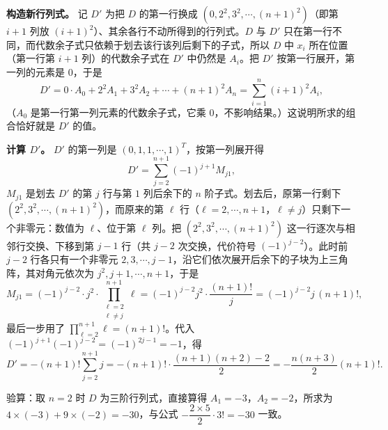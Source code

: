 \begin{solution}
\textbf{构造新行列式。} 记 $D'$ 为把 $D$ 的第一行换成 $(0,2^{2},3^{2},\cdots,(n+1)^{2})$（即第 $i+1$ 列放 $(i+1)^{2}$）、其余各行不动所得到的行列式。$D$ 与 $D'$ 只在第一行不同，而代数余子式只依赖于划去该行该列后剩下的子式，所以 $D$ 中 $x_i$ 所在位置（第一行第 $i+1$ 列）的代数余子式在 $D'$ 中仍然是 $A_i$。把 $D'$ 按第一行展开，第一列的元素是 $0$，于是
\[
D'=0\cdot A_0+2^{2}A_1+3^{2}A_2+\cdots+(n+1)^{2}A_n=\sum_{i=1}^{n}(i+1)^{2}A_i,
\]
（$A_0$ 是第一行第一列元素的代数余子式，它乘 $0$，不影响结果。）这说明所求的组合恰好就是 $D'$ 的值。

\textbf{计算 $D'$。} $D'$ 的第一列是 $(0,1,1,\cdots,1)^{T}$，按第一列展开得
\[
D'=\sum_{j=2}^{n+1}(-1)^{j+1}M_{j1},
\]
$M_{j1}$ 是划去 $D'$ 的第 $j$ 行与第 $1$ 列后余下的 $n$ 阶子式。划去后，原第一行剩下 $(2^{2},3^{2},\cdots,(n+1)^{2})$，而原来的第 $\ell$ 行（$\ell=2,\cdots,n+1$，$\ell\ne j$）只剩下一个非零元：数值为 $\ell$、位于第 $\ell$ 列。把 $(2^{2},3^{2},\cdots,(n+1)^{2})$ 这一行逐次与相邻行交换、下移到第 $j-1$ 行（共 $j-2$ 次交换，代价符号 $(-1)^{j-2}$）。此时前 $j-2$ 行各只有一个非零元 $2,3,\cdots,j-1$，沿它们依次展开后余下的子块为上三角阵，其对角元依次为 $j^{2},j+1,\cdots,n+1$，于是
\[
M_{j1}=(-1)^{j-2}\cdot j^{2}\cdot\prod_{\substack{\ell=2\\ \ell\ne j}}^{n+1}\ell
=(-1)^{j-2}j^{2}\cdot\frac{(n+1)!}{j}=(-1)^{j-2}j\,(n+1)!,
\]
最后一步用了 $\displaystyle\prod_{\ell=2}^{n+1}\ell=(n+1)!$。代入 $(-1)^{j+1}(-1)^{j-2}=(-1)^{2j-1}=-1$，得
\[
D'=-(n+1)!\sum_{j=2}^{n+1}j=-(n+1)!\cdot\frac{(n+1)(n+2)-2}{2}=-\frac{n(n+3)}{2}(n+1)! .
\]

验算：取 $n=2$ 时 $D$ 为三阶行列式，直接算得 $A_1=-3$，$A_2=-2$，所求为 $4\times(-3)+9\times(-2)=-30$，与公式 $-\dfrac{2\times5}{2}\cdot3!=-30$ 一致。
\end{solution}

